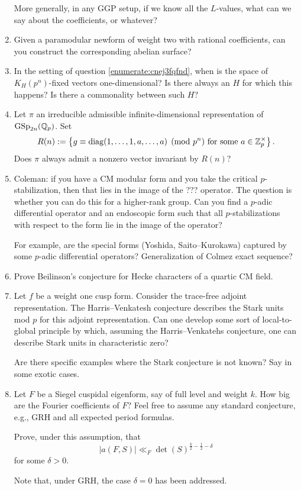 \documentclass[reqno]{amsart} 
\begin{document}
\begin{enumerate}
  More generally, in any GGP setup, if we know all the $L$-values, what can we say about the coefficients, or whatever?
\item\label{enumerate:cnej3mdce1} Given a paramodular newform of weight two with rational coefficients, can you construct the corresponding abelian surface?  \cite{MR3981316}
\item\label{enumerate:cnej3mdbho} In the setting of question \eqref{enumerate:cnej3fqfnd}, when is the space of $K_H(p^n)$-fixed vectors one-dimensional?  Is there always an $H$ for which this happens?  Is there a commonality between such $H$?
\item\label{enumerate:cnej3mc9yo} Let $\pi$ an irreducible admissible infinite-dimensional representation of $\operatorname{GSp}_{2 n}(\mathbb{Q}_p)$.  Set
  \begin{equation*}
    R(n) := \left\{
      g \equiv \operatorname{diag}(1,\dotsc,1,a,\dotsc,a) \pmod{p^n} \text{ for some } a \in \mathbb{Z}_p^\times
    \right\}.
  \end{equation*}
  Does $\pi$ always admit a nonzero vector invariant by $R(n)$?
\item\label{enumerate:cnej3mc563} Coleman: if you have a CM modular form and you take the critical $p$-stabilization, then that lies in the image of the ??? operator.  The question is whether you can do this for a higher-rank group.  Can you find a $p$-adic differential operator and an endoscopic form such that all $p$-stabilizations with respect to the form lie in the image of the operator?

  For example, are the special forms (Yoshida, Saito--Kurokawa) captured by some $p$-adic differential operators?  Generalization of Colmez exact sequence?
\item\label{enumerate:cnej3mcyt4} Prove Beilinson's conjecture for Hecke characters of a quartic CM field.
\item\label{enumerate:cnej3mrs9m} Let $f$ be a weight one cusp form.  Consider the trace-free adjoint representation.  The Harris--Venkatesh conjecture describes the Stark units mod $p$ for this adjoint representation.  Can one develop some sort of local-to-global principle by which, assuming the Harris--Venkatehs conjecture, one can describe Stark units in characteristic zero?

  Are there specific examples where the Stark conjecture is not known?  Say in some exotic cases.
\item\label{enumerate:cnej3m2v7l} Let $F$ be a Siegel cuspidal eigenform, say of full level and weight $k$.  How big are the Fourier coefficients of $F$?  Feel free to assume any standard conjecture, e.g., GRH and all expected period formulas.

  Prove, under this assumption, that
  \begin{equation*}
    \left\lvert a(F, S) \right\rvert \ll_F \det(S)^{\frac{k}{2} - \frac{1}{2} - \delta}
  \end{equation*}
  for some $\delta > 0$.

  Note that, under GRH, the case $\delta = 0$ has been addressed.
\end{enumerate}
\end{document}
